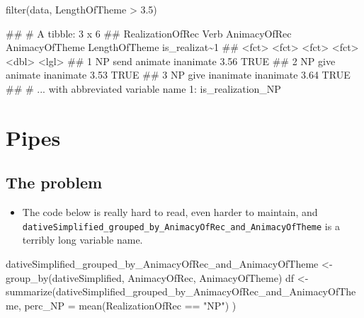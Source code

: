 \documentclass[
]{book}
\newenvironment{Shaded}{\begin{snugshade}}{\end{snugshade}}
\newcommand{\AttributeTok}[1]{\textcolor[rgb]{0.77,0.63,0.00}{#1}}
\newcommand{\FloatTok}[1]{\textcolor[rgb]{0.00,0.00,0.81}{#1}}
\newcommand{\FunctionTok}[1]{\textcolor[rgb]{0.00,0.00,0.00}{#1}}
\newcommand{\NormalTok}[1]{#1}
\newcommand{\OtherTok}[1]{\textcolor[rgb]{0.56,0.35,0.01}{#1}}
\newcommand{\SpecialCharTok}[1]{\textcolor[rgb]{0.00,0.00,0.00}{#1}}
\newcommand{\StringTok}[1]{\textcolor[rgb]{0.31,0.60,0.02}{#1}}
\providecommand{\tightlist}{%
  \setlength{\itemsep}{0pt}\setlength{\parskip}{0pt}}
\begin{document}
\begin{Shaded}
\begin{Highlighting}[]
\FunctionTok{filter}\NormalTok{(data, LengthOfTheme }\SpecialCharTok{\textgreater{}} \FloatTok{3.5}\NormalTok{)}
\end{Highlighting}
\end{Shaded}

\begin{Shaded}
\begin{Highlighting}[]
\NormalTok{\#\# \# A tibble: 3 x 6}
\NormalTok{\#\#   RealizationOfRec Verb  AnimacyOfRec AnimacyOfTheme LengthOfTheme is\_realizat\textasciitilde{}1}
\NormalTok{\#\#   \textless{}fct\textgreater{}            \textless{}fct\textgreater{} \textless{}fct\textgreater{}        \textless{}fct\textgreater{}                  \textless{}dbl\textgreater{} \textless{}lgl\textgreater{}        }
\NormalTok{\#\# 1 NP               send  animate      inanimate               3.56 TRUE         }
\NormalTok{\#\# 2 NP               give  animate      inanimate               3.53 TRUE         }
\NormalTok{\#\# 3 NP               give  inanimate    inanimate               3.64 TRUE         }
\NormalTok{\#\# \# ... with abbreviated variable name 1: is\_realization\_NP}
\end{Highlighting}
\end{Shaded}

\hypertarget{pipes}{%
\section{Pipes}\label{pipes}}

\hypertarget{the-problem}{%
\subsection{The problem}\label{the-problem}}

\begin{itemize}
\tightlist
\item
  The code below is really hard to read, even harder to maintain, and \texttt{dativeSimplified\_grouped\_by\_AnimacyOfRec\_and\_AnimacyOfTheme} is a terribly long variable name.
\end{itemize}

\begin{Shaded}
\begin{Highlighting}[]
\NormalTok{dativeSimplified\_grouped\_by\_AnimacyOfRec\_and\_AnimacyOfTheme }\OtherTok{\textless{}{-}}
      \FunctionTok{group\_by}\NormalTok{(dativeSimplified, AnimacyOfRec, AnimacyOfTheme)}
\NormalTok{df }\OtherTok{\textless{}{-}} \FunctionTok{summarize}\NormalTok{(dativeSimplified\_grouped\_by\_AnimacyOfRec\_and\_AnimacyOfTheme, }
                  \AttributeTok{perc\_NP =} \FunctionTok{mean}\NormalTok{(RealizationOfRec }\SpecialCharTok{==} \StringTok{"NP"}\NormalTok{) )}
\end{Highlighting}
\end{Shaded}
\end{document}
